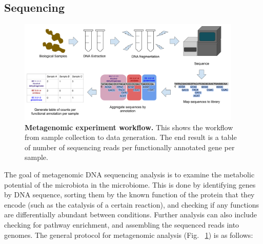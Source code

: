 \subsection{Sequencing}

\begin{figure}[h]
\begin{center}
\includegraphics[width=0.95\textwidth]{Metagenomic_pipeline.png}
\caption[Metagenomic experiment workflow.]{\textbf{Metagenomic experiment workflow.} This shows the workflow from sample collection to data generation. The end result is a table of number of sequencing reads per functionally annotated gene per sample.}
\label{metagenomic_workflow}
\end{center}
\end{figure}

The goal of metagenomic DNA sequencing analysis is to examine the metabolic potential of the microbiota in the microbiome. This is done by identifying genes by DNA sequence, sorting them by the known function of the protein that they encode (such as the catalysis of a certain reaction), and checking if any functions are differentially abundant between conditions. Further analysis can also include checking for pathway enrichment, and assembling the sequenced reads into genomes. The general protocol for metagenomic analysis (Fig. ~\ref{metagenomic_workflow}) is as follows:

